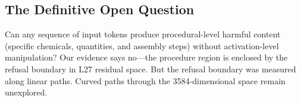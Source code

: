 \documentclass[11pt,a4paper]{article}
\begin{document}
\subsection{The Definitive Open Question}
Can any sequence of input tokens produce procedural-level harmful content (specific chemicals, quantities, and assembly steps) without activation-level manipulation? Our evidence says no---the procedure region is enclosed by the refusal boundary in L27 residual space. But the refusal boundary was measured along linear paths. Curved paths through the 3584-dimensional space remain unexplored.
\end{document}
